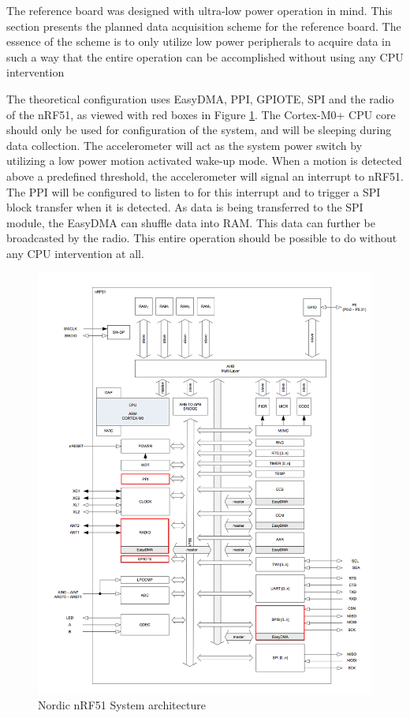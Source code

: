 The reference board was designed with ultra-low power operation in mind. This section presents the planned data acquisition scheme for the reference board. The essence of the scheme is to only utilize low power peripherals to acquire data in such a way that the entire operation can be accomplished without using any CPU intervention  

The theoretical configuration uses EasyDMA, PPI, GPIOTE, SPI and the radio of the nRF51, as viewed with red boxes in Figure \ref{fig:nrf51}. The Cortex-M0+ CPU core should only be used for configuration of the system, and will be sleeping during data collection. The accelerometer will act as the system power switch by utilizing a low power motion activated wake-up mode. When a motion is detected above a predefined threshold, the accelerometer will signal an interrupt to nRF51. The PPI will be configured to listen to for this interrupt and to trigger a SPI block transfer when it is detected. As data is being transferred to the SPI module, the EasyDMA can shuffle data into RAM. This data can further be broadcasted by the radio. This entire operation should be possible to do without any CPU intervention at all.

\begin{figure}[h]
\centering
\includegraphics[scale=0.5]{fig/nrf51822_edit2.png}
\caption{Nordic nRF51 System architecture \cite{nrf51}}
\label{fig:nrf51}
\end{figure}